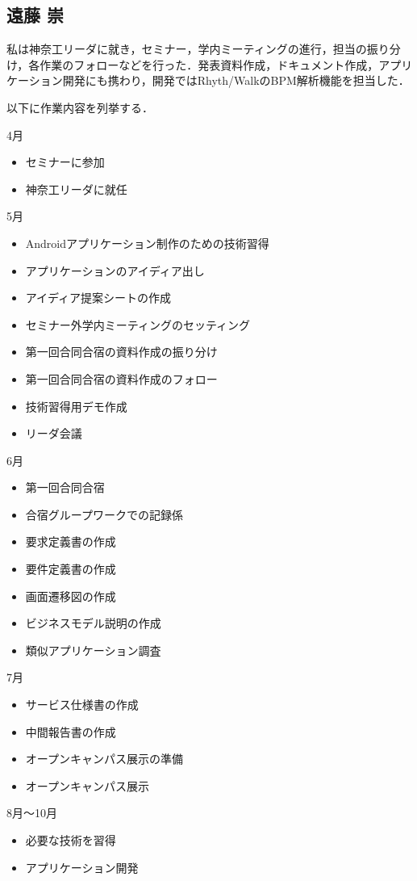 \subsection{遠藤 崇}
\par 私は神奈工リーダに就き，セミナー，学内ミーティングの進行，担当の振り分け，各作業のフォローなどを行った．発表資料作成，ドキュメント作成，アプリケーション開発にも携わり，開発ではRhyth/WalkのBPM解析機能を担当した．
\par 以下に作業内容を列挙する．

4月
\begin{itemize}
\item セミナーに参加
\item 神奈工リーダに就任
\end{itemize}
5月
\begin{itemize}
\item Androidアプリケーション制作のための技術習得
\item アプリケーションのアイディア出し
\item アイディア提案シートの作成
\item セミナー外学内ミーティングのセッティング
\item 第一回合同合宿の資料作成の振り分け
\item 第一回合同合宿の資料作成のフォロー
\item 技術習得用デモ作成
\item リーダ会議
\end{itemize}
6月
\begin{itemize}
\item 第一回合同合宿
\item 合宿グループワークでの記録係
\item 要求定義書の作成
\item 要件定義書の作成
\item 画面遷移図の作成
\item ビジネスモデル説明の作成
\item 類似アプリケーション調査
\end{itemize}
7月
\begin{itemize}
\item サービス仕様書の作成
\item 中間報告書の作成
\item オープンキャンパス展示の準備
\item オープンキャンパス展示
\end{itemize}
8月～10月
\begin{itemize}
\item 必要な技術を習得
\item アプリケーション開発
\end{itemize}

